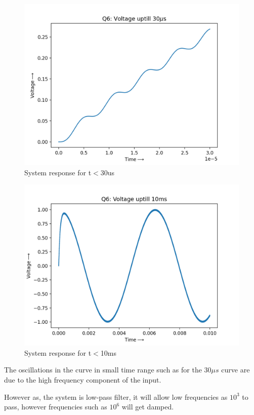 \documentclass[11pt, a4paper]{article}
\begin{document}
\begin{figure}[tbh!]
\includegraphics[scale=0.6]{Q6_1.png}
\centering
\caption{System response for t$<$30us}
\label{fig:System response for t<30us}
\end{figure}
\clearpage
\begin{figure}[tbh!]
\includegraphics[scale=0.6]{Q6_2.png}
\centering
\caption{System response for t$<$10ms}
\label{fig:System response for t<10ms}
\end{figure}
The oscillations in the curve in small time range such as for the $30\mu s$ curve are due to the high frequency component of the input.

However as, the system is low-pass filter, it will allow low frequencies as $10^3$ to pass, however frequencies such as $10^6$ will get damped.
\end{document}
